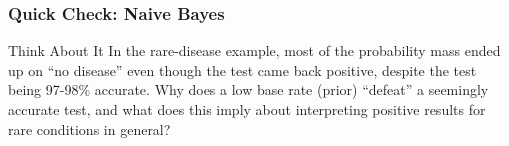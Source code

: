 








\begin{frame}[fragile]\frametitle{Quick Check: Naive Bayes}
\begin{block}{Think About It}
In the rare-disease example, most of the probability mass ended up on ``no disease'' even
though the test came back positive, despite the test being 97-98\% accurate. Why does a low
base rate (prior) ``defeat'' a seemingly accurate test, and what does this imply about
interpreting positive results for rare conditions in general?
\end{block}
\end{frame}

